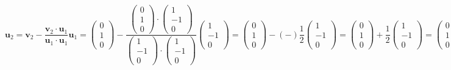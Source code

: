 \documentclass[a3paper,12pt]{extarticle} %
\begin{document}
\begin{enumerate}
\begin{enumerate}
\[            \mathbf{u}_2 = \mathbf{v}_2 - \frac{\mathbf{v}_2 \cdot \mathbf{u}_1}{\mathbf{u}_1 \cdot \mathbf{u}_1} \mathbf{u}_1 = \begin{pmatrix} 0 \\ 1 \\ 0 \end{pmatrix} - \frac{\begin{pmatrix} 0 \\ 1 \\ 0 \end{pmatrix} \cdot \begin{pmatrix} 1 \\ -1 \\ 0 \end{pmatrix}}{\begin{pmatrix} 1 \\ -1 \\ 0 \end{pmatrix} \cdot \begin{pmatrix} 1 \\ -1 \\ 0 \end{pmatrix}} \begin{pmatrix} 1 \\ -1 \\ 0 \end{pmatrix} = \begin{pmatrix} 0 \\ 1 \\ 0 \end{pmatrix} - (-)\frac{1}{2} \begin{pmatrix} 1 \\ -1 \\ 0 \end{pmatrix} = \begin{pmatrix} 0 \\ 1 \\ 0 \end{pmatrix} + \frac{1}{2} \begin{pmatrix} 1 \\ -1 \\ 0 \end{pmatrix} = \begin{pmatrix} 0 \\ 1 \\ 0 \end{pmatrix} + \begin{pmatrix} \frac{1}{2} \\ -\frac{1}{2} \\ 0 \end{pmatrix} = \begin{pmatrix} 0 + \frac{1}{2} \\ 1 - \frac{1}{2} \\ 0 \end{pmatrix} = \begin{pmatrix} \frac{1}{2} \\ \frac{1}{2} \\ 0 \end{pmatrix}
\]
\end{enumerate}
\end{enumerate}
\end{document}
